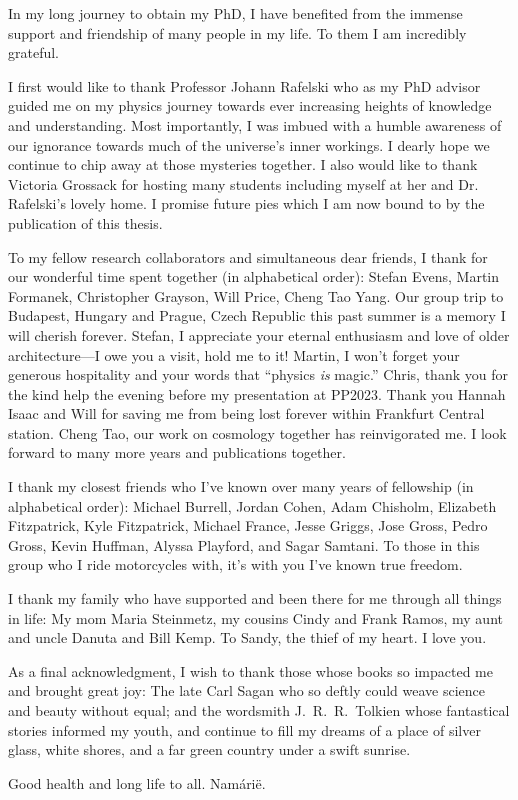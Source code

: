 
In my long journey to obtain my PhD, I have benefited from the immense support and friendship of many people in my life. To them I am incredibly grateful.

I first would like to thank Professor Johann Rafelski who as my PhD advisor guided me on my physics journey towards ever increasing heights of knowledge and understanding. Most importantly, I was imbued with a humble awareness of our ignorance towards much of the universe's inner workings. I dearly hope we continue to chip away at those mysteries together. I also would like to thank Victoria Grossack for hosting many students including myself at her and Dr. Rafelski's lovely home. I promise future pies which I am now bound to by the publication of this thesis.

To my fellow research collaborators and simultaneous dear friends, I thank for our wonderful time spent together (in alphabetical order): Stefan Evens, Martin Formanek, Christopher Grayson, Will Price, Cheng Tao Yang. Our group trip to Budapest, Hungary and Prague, Czech Republic this past summer is a memory I will cherish forever. Stefan, I appreciate your eternal enthusiasm and love of older architecture---I owe you a visit, hold me to it! Martin, I won't forget your generous hospitality and your words that ``physics \emph{is} magic.'' Chris, thank you for the kind help the evening before my presentation at PP2023. Thank you Hannah Isaac and Will for saving me from being lost forever within Frankfurt Central station. Cheng Tao, our work on cosmology together has reinvigorated me. I look forward to many more years and publications together.

I thank my closest friends who I've known over many years of fellowship (in alphabetical order): Michael Burrell, Jordan Cohen, Adam Chisholm, Elizabeth Fitzpatrick, Kyle Fitzpatrick, Michael France, Jesse Griggs, Jose Gross, Pedro Gross, Kevin Huffman, Alyssa Playford, and Sagar Samtani. To those in this group who I ride motorcycles with, it's with you I've known true freedom.

I thank my family who have supported and been there for me through all things in life: My mom Maria Steinmetz, my cousins Cindy and Frank Ramos, my aunt and uncle Danuta and Bill Kemp. {\color{white} To Sandy, the thief of my heart. I love you.}

As a final acknowledgment, I wish to thank those whose books so impacted me and brought great joy: The late Carl Sagan who so deftly could weave science and beauty without equal; and the wordsmith J.~R.~R.~Tolkien whose fantastical stories informed my youth, and continue to fill my dreams of a place of silver glass, white shores, and a far green country under a swift sunrise.

Good health and long life to all. Nam\'ari\"e.